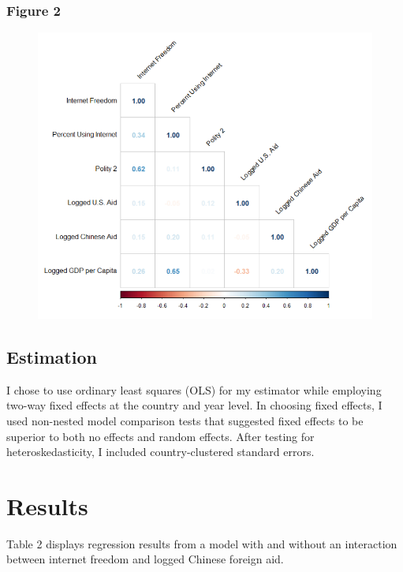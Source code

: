 \documentclass[12pt]{article}
\begin{document}
\pagebreak
\subsubsection*{Figure 2}
\begin{figure}[htbp]
    \includegraphics[scale=0.7]{628plot3.png}
\end{figure}

\subsection*{Estimation}
I chose to use ordinary least squares (OLS) for my estimator while employing two-way fixed effects at the country and year level. In choosing fixed effects, I used non-nested model comparison tests that suggested fixed effects to be superior to both no effects and random effects. After testing for heteroskedasticity, I included country-clustered standard errors.

\pagebreak
\section*{Results}
Table 2 displays regression results from a model with and without an interaction between internet freedom and logged Chinese foreign aid.
\end{document}
